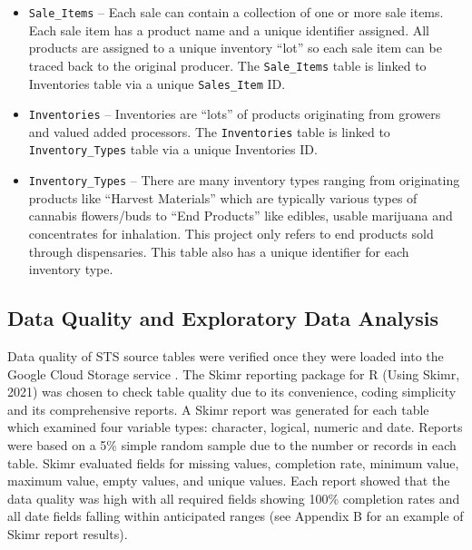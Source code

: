 \documentclass[../article.tex, 12pt]{subfiles}
\begin{document}
\begin{multicols*}{2}
\begin{itemize}
\item \texttt{Sale\_Items} – Each sale can contain a collection of one or more sale items. Each sale item has a product name and a unique identifier assigned. All products are assigned to a unique inventory ``lot'' so each sale item can be traced back to the original producer. The \texttt{Sale\_Items} table is linked to Inventories table via a unique \texttt{Sales\_Item} ID.

\item \texttt{Inventories} – Inventories are ``lots'' of products originating from growers and valued added processors. The \texttt{Inventories} table is linked to \texttt{Inventory\_Types} table via a unique Inventories ID.

\item \texttt{Inventory\_Types} – There are many inventory types ranging from originating products like ``Harvest Materials'' which are typically various types of cannabis flowers/buds to ``End Products'' like edibles, usable marijuana and concentrates for inhalation. This project only refers to end products sold through dispensaries. This table also has a unique identifier for each inventory type.
\end{itemize}

\subsection{Data Quality and Exploratory Data Analysis}

Data quality of STS source tables were verified once they were loaded into the Google Cloud Storage service \citep{MERINO2016123}. The Skimr reporting package for R (Using Skimr, 2021) was chosen to check table quality due to its convenience, coding simplicity and its comprehensive reports. A Skimr report was generated for each table which examined four variable types: character, logical, numeric and date. Reports were based on a 5\% simple random sample due to the number or records in each table. Skimr evaluated fields for missing values, completion rate, minimum value, maximum value, empty values, and unique values. Each report showed that the data quality was high with all required fields showing 100\% completion rates and all date fields falling within anticipated ranges (see Appendix B for an example of Skimr report results).


\end{multicols*}
\end{document}
